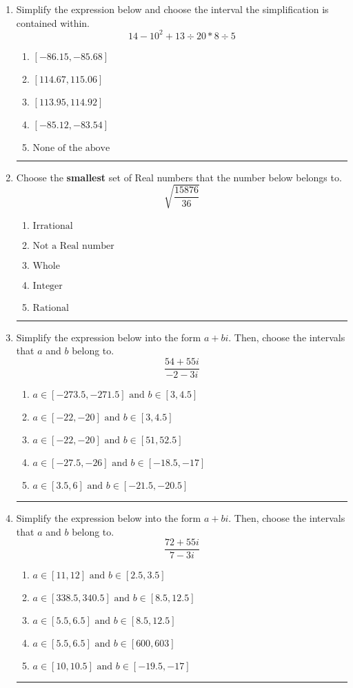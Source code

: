\documentclass[14pt]{extbook}
\newcommand{\litem}[1]{\item#1\hspace*{-1cm}\rule{\textwidth}{0.4pt}}
\begin{document}
\begin{enumerate}
{\begin{enumerate}[label=\Alph*.]
\end{enumerate} }
\litem{
Simplify the expression below and choose the interval the simplification is contained within.\[ 14 - 10^2 + 13 \div 20 * 8 \div 5 \]\begin{enumerate}[label=\Alph*.]
\item \( [-86.15, -85.68] \)
\item \( [114.67, 115.06] \)
\item \( [113.95, 114.92] \)
\item \( [-85.12, -83.54] \)
\item \( \text{None of the above} \)

\end{enumerate} }
\litem{
Choose the \textbf{smallest} set of Real numbers that the number below belongs to.\[ \sqrt{\frac{15876}{36}} \]\begin{enumerate}[label=\Alph*.]
\item \( \text{Irrational} \)
\item \( \text{Not a Real number} \)
\item \( \text{Whole} \)
\item \( \text{Integer} \)
\item \( \text{Rational} \)

\end{enumerate} }
\litem{
Simplify the expression below into the form $a+bi$. Then, choose the intervals that $a$ and $b$ belong to.\[ \frac{54 + 55 i}{-2 - 3 i} \]\begin{enumerate}[label=\Alph*.]
\item \( a \in [-273.5, -271.5] \text{ and } b \in [3, 4.5] \)
\item \( a \in [-22, -20] \text{ and } b \in [3, 4.5] \)
\item \( a \in [-22, -20] \text{ and } b \in [51, 52.5] \)
\item \( a \in [-27.5, -26] \text{ and } b \in [-18.5, -17] \)
\item \( a \in [3.5, 6] \text{ and } b \in [-21.5, -20.5] \)

\end{enumerate} }
\litem{
Simplify the expression below into the form $a+bi$. Then, choose the intervals that $a$ and $b$ belong to.\[ \frac{72 + 55 i}{7 - 3 i} \]\begin{enumerate}[label=\Alph*.]
\item \( a \in [11, 12] \text{ and } b \in [2.5, 3.5] \)
\item \( a \in [338.5, 340.5] \text{ and } b \in [8.5, 12.5] \)
\item \( a \in [5.5, 6.5] \text{ and } b \in [8.5, 12.5] \)
\item \( a \in [5.5, 6.5] \text{ and } b \in [600, 603] \)
\item \( a \in [10, 10.5] \text{ and } b \in [-19.5, -17] \)


\end{enumerate}}
\end{enumerate}
\end{document}
